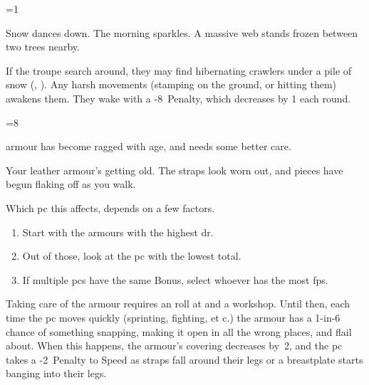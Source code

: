 \ifnum\value{cycle}=1

\begin{boxtext}
  Snow dances down.
  The morning sparkles.
  A massive web stands frozen between two trees nearby.
\end{boxtext}

If the troupe search around, they may find  hibernating \glspl{crawler} under a pile of snow (, \tn[10]).
Any harsh movements (stamping on the ground, or hitting them) awakens them.
They wake with a -8~Penalty, which decreases by 1 each \gls{round}.


\else

\ifnum\value{r12}=8

 armour has become ragged with age, and needs some better care.

\begin{boxtext}
  Your leather armour's getting old.
  The straps look worn out, and pieces have begun flaking off as you walk.
\end{boxtext}

Which \gls{pc} this affects, depends on a few factors.

\begin{enumerate}
  \item
  Start with the \glspl{armour} with the highest \gls{dr}.
  \item
  Out of those, look at the \gls{pc} with the lowest  total.
  \item
  If multiple \glspl{pc} have the same Bonus, select whoever has the most \glspl{fp}.
\end{enumerate}

Taking care of the \gls{armour} requires an  roll at \tn[10] and a workshop.
Until then, each time the \gls{pc} moves quickly (sprinting, fighting, et c.) the armour has a 1-in-6 chance of something snapping, making it open in all the wrong places, and flail about.
When this happens, the \gls{armour}'s \gls{covering} decreases by~2, and the \gls{pc} takes a -2~Penalty to Speed as straps fall around their legs or a breastplate starts banging into their legs.

\fi

\fi
